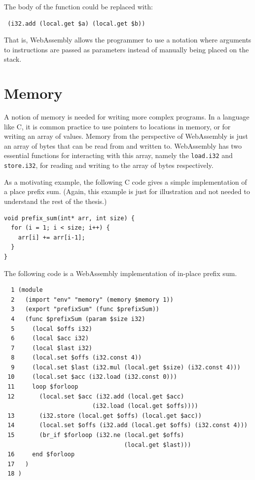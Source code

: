 \documentclass[11pt]{book}
\begin{document}
The body of the function could be replaced with:
\begin{verbatim}
 (i32.add (local.get $a) (local.get $b))
\end{verbatim}
That is, WebAssembly allows the programmer to use a notation where arguments to instructions are passed as parameters instead of manually being placed on the stack.



\section{Memory}

A notion of memory is needed for writing more complex programs. In a language like C, it is common practice to use pointers to locations in memory, or for writing an array of values. Memory from the perspective of WebAssembly is just an array of bytes that can be read from and written to. WebAssembly has two essential functions for interacting with this array, namely the \texttt{load.i32} and \texttt{store.i32}, for reading and writing to the array of bytes respectively.

As a motivating example, the following C code gives a simple implementation of a place prefix sum. (Again, this example is just for illustration and not needed to understand the rest of the thesis.)

\begin{verbatim}
void prefix_sum(int* arr, int size) {
  for (i = 1; i < size; i++) {
    arr[i] += arr[i-1];
  }
}
\end{verbatim}
The following code is a WebAssembly implementation of in-place prefix sum.
\begin{verbatim}
  1 (module
  2   (import "env" "memory" (memory $memory 1))
  3   (export "prefixSum" (func $prefixSum))
  4   (func $prefixSum (param $size i32)
  5     (local $offs i32)
  6     (local $acc i32)
  7     (local $last i32)
  8     (local.set $offs (i32.const 4))
  9     (local.set $last (i32.mul (local.get $size) (i32.const 4)))
 10     (local.set $acc (i32.load (i32.const 0)))
 11     loop $forloop
 12       (local.set $acc (i32.add (local.get $acc) 
                         (i32.load (local.get $offs))))
 13       (i32.store (local.get $offs) (local.get $acc))
 14       (local.set $offs (i32.add (local.get $offs) (i32.const 4)))
 15       (br_if $forloop (i32.ne (local.get $offs) 
                                  (local.get $last)))
 16     end $forloop
 17   )
 18 )
\end{verbatim}
\end{document}
